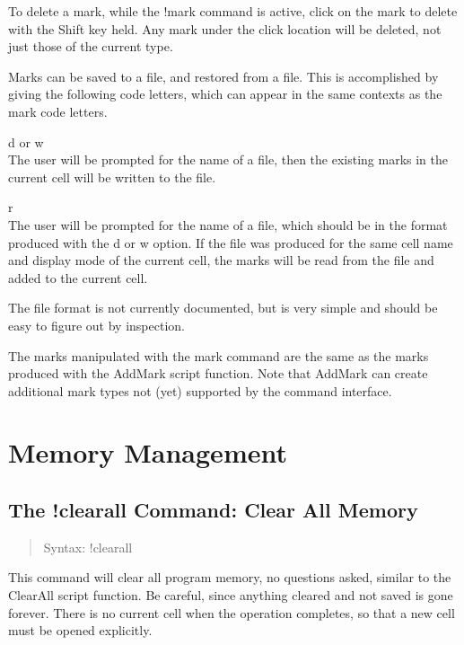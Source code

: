 To delete a mark, while the {\cb !mark} command is active, click on
the mark to delete with the {\kb Shift} key held.  Any mark under the
click location will be deleted, not just those of the current type.

Marks can be saved to a file, and restored from a file.  This is
accomplished by giving the following code letters, which can appear in
the same contexts as the mark code letters.

\begin{description}
\item{{\vt d} or {\vt w}}\\
The user will be prompted for the name of a file, then the
existing marks in the current cell will be written to the file.

\item{\vt r}\\
The user will be prompted for the name of a file, which should be in
the format produced with the {\vt d} or {\vt w} option.  If the file
was produced for the same cell name and display mode of the current
cell, the marks will be read from the file and added to the current
cell.
\end{description}

The file format is not currently documented, but is very simple and
should be easy to figure out by inspection.

The marks manipulated with the {\cb mark} command are the same as the
marks produced with the {\vt AddMark} script function.  Note that {\vt
AddMark} can create additional mark types not (yet) supported by the
command interface.


\section{Memory Management}

\subsection{The {\cb !clearall} Command: Clear All Memory}
\begin{quote}
Syntax: {\vt !clearall}
\end{quote}
This command will clear all program memory, no questions asked,
similar to the {\vt ClearAll} script function.  Be careful, since
anything cleared and not saved is gone forever.  There is no current
cell when the operation completes, so that a new cell must be opened
explicitly.

